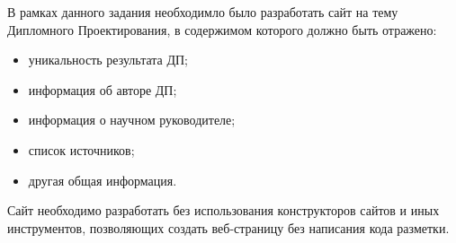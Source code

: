   
\printglossaries


В рамках данного задания необходимло было разработать сайт на тему Дипломного Проектирования, в содержимом которого должно быть отражено:
\begin{itemize}
	\item уникальность результата ДП;
	\item информация об авторе ДП;
	\item информация о научном руководителе;
	\item список источников;
	\item другая общая информация.
\end{itemize}

Сайт необходимо разработать без использования конструкторов сайтов и иных инструментов, позволяющих создать веб-страницу без написания кода разметки.